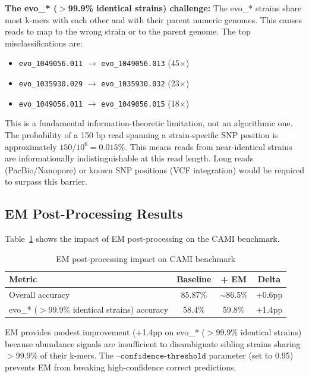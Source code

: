 \documentclass{article}
\begin{document}
\textbf{The evo\_* ($>$99.9\% identical strains) challenge:} The evo\_* strains share most k-mers with each other and with their parent numeric genomes. This causes reads to map to the wrong strain or to the parent genome. The top misclassifications are:
\begin{itemize}
    \item \texttt{evo\_1049056.011} $\rightarrow$ \texttt{evo\_1049056.013} (45$\times$)
    \item \texttt{evo\_1035930.029} $\rightarrow$ \texttt{evo\_1035930.032} (23$\times$)
    \item \texttt{evo\_1049056.011} $\rightarrow$ \texttt{evo\_1049056.015} (18$\times$)
\end{itemize}

This is a fundamental information-theoretic limitation, not an algorithmic one. The probability of a 150 bp read spanning a strain-specific SNP position is approximately $150/10^6 = 0.015\%$. This means reads from near-identical strains are informationally indistinguishable at this read length. Long reads (PacBio/Nanopore) or known SNP positions (VCF integration) would be required to surpass this barrier.

\subsection{EM Post-Processing Results}

Table~\ref{tab:em} shows the impact of EM post-processing on the CAMI benchmark.

\begin{table}[H]
\centering
\caption{EM post-processing impact on CAMI benchmark}
\label{tab:em}
\begin{tabular}{lccc}
\toprule
\textbf{Metric} & \textbf{Baseline} & \textbf{+ EM} & \textbf{Delta} \\
\midrule
Overall accuracy & 85.87\% & $\sim$86.5\% & +0.6pp \\
evo\_* ($>$99.9\% identical strains) accuracy & 58.4\% & 59.8\% & +1.4pp \\
\bottomrule
\end{tabular}
\end{table}

EM provides modest improvement (+1.4pp on evo\_* ($>$99.9\% identical strains) because abundance signals are insufficient to disambiguate sibling strains sharing $>$99.9\% of their k-mers. The $\texttt{--confidence-threshold}$ parameter (set to 0.95) prevents EM from breaking high-confidence correct predictions.
\end{document}
